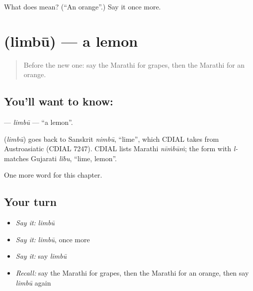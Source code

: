 \begin{tcolorbox}[breakable,colback=teal!4,colframe=teal!35!black,title={Before you move on}]
What does  mean? (\textquotedblleft{}An orange\textquotedblright{}.) Say it once more.
\end{tcolorbox}
\section[\texorpdfstring{\mr{लिंबू} (limbū)}{लिंबू (limbū)}]{ (limbū) — a lemon}

\label{lesson:MR-C88-limbu}



\begin{quote}
Before the new one: say the Marathi for grapes, then the Marathi for an orange.
\end{quote}

\subsection*{You'll want to know: }
\textbf{} — \emph{limbū} — \textquotedblleft{}a lemon\textquotedblright{}.

\begin{cousinweb}
\textbf{} (\emph{limbū}) goes back to Sanskrit \emph{nimbū}, \textquotedblleft{}lime\textquotedblright{}, which CDIAL takes from Austroasiatic (CDIAL 7247). CDIAL lists Marathi \emph{nīṁbūṁ}; the form with \emph{l-} matches Gujarati \emph{lĩbu}, \textquotedblleft{}lime, lemon\textquotedblright{}.
\end{cousinweb}

\begin{grammarlens}[title={What you've built}]
One more word for this chapter.
\end{grammarlens}

\subsection*{Your turn}
\begin{itemize}
\raggedright
  \item \emph{Say it:} \emph{limbū}
  \item \emph{Say it:} \emph{limbū}, once more
  \item \emph{Say it:} say \emph{limbū}
  \item \emph{Recall:} say the Marathi for grapes, then the Marathi for an orange, then say \emph{limbū} again
\end{itemize}

